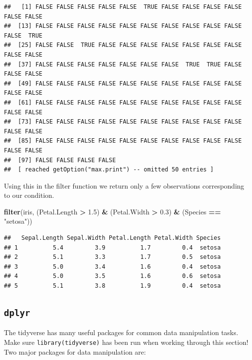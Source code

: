 \documentclass[
]{book}
\newenvironment{Shaded}{\begin{snugshade}}{\end{snugshade}}
\newcommand{\FloatTok}[1]{\textcolor[rgb]{0.00,0.00,0.81}{#1}}
\newcommand{\KeywordTok}[1]{\textcolor[rgb]{0.13,0.29,0.53}{\textbf{#1}}}
\newcommand{\NormalTok}[1]{#1}
\newcommand{\OperatorTok}[1]{\textcolor[rgb]{0.81,0.36,0.00}{\textbf{#1}}}
\newcommand{\StringTok}[1]{\textcolor[rgb]{0.31,0.60,0.02}{#1}}
\theoremstyle{definition}
\theoremstyle{definition}
\theoremstyle{definition}
\theoremstyle{remark}
\begin{document}
\begin{verbatim}
##   [1] FALSE FALSE FALSE FALSE FALSE  TRUE FALSE FALSE FALSE FALSE FALSE FALSE
##  [13] FALSE FALSE FALSE FALSE FALSE FALSE FALSE FALSE FALSE FALSE FALSE  TRUE
##  [25] FALSE FALSE  TRUE FALSE FALSE FALSE FALSE FALSE FALSE FALSE FALSE FALSE
##  [37] FALSE FALSE FALSE FALSE FALSE FALSE FALSE  TRUE  TRUE FALSE FALSE FALSE
##  [49] FALSE FALSE FALSE FALSE FALSE FALSE FALSE FALSE FALSE FALSE FALSE FALSE
##  [61] FALSE FALSE FALSE FALSE FALSE FALSE FALSE FALSE FALSE FALSE FALSE FALSE
##  [73] FALSE FALSE FALSE FALSE FALSE FALSE FALSE FALSE FALSE FALSE FALSE FALSE
##  [85] FALSE FALSE FALSE FALSE FALSE FALSE FALSE FALSE FALSE FALSE FALSE FALSE
##  [97] FALSE FALSE FALSE FALSE
##  [ reached getOption("max.print") -- omitted 50 entries ]
\end{verbatim}

Using this in the filter function we return only a few observations corresponding to our condition.

\begin{Shaded}
\begin{Highlighting}[]
\KeywordTok{filter}\NormalTok{(iris, (Petal.Length }\OperatorTok{>}\StringTok{ }\FloatTok{1.5}\NormalTok{) }\OperatorTok{&}\StringTok{ }\NormalTok{(Petal.Width }\OperatorTok{>}\StringTok{ }\FloatTok{0.3}\NormalTok{) }\OperatorTok{&}\StringTok{ }
\StringTok{         }\NormalTok{(Species }\OperatorTok{==}\StringTok{ "setosa"}\NormalTok{))}
\end{Highlighting}
\end{Shaded}

\begin{verbatim}
##   Sepal.Length Sepal.Width Petal.Length Petal.Width Species
## 1          5.4         3.9          1.7         0.4  setosa
## 2          5.1         3.3          1.7         0.5  setosa
## 3          5.0         3.4          1.6         0.4  setosa
## 4          5.0         3.5          1.6         0.6  setosa
## 5          5.1         3.8          1.9         0.4  setosa
\end{verbatim}

\hypertarget{dplyr}{%
\subsection{\texorpdfstring{\texttt{dplyr}}{dplyr}}\label{dplyr}}

The tidyverse has many useful packages for common data manipulation tasks. Make sure \texttt{library(tidyverse)} has been run when working through this section!\\
Two major packages for data manipulation are:
\end{document}
